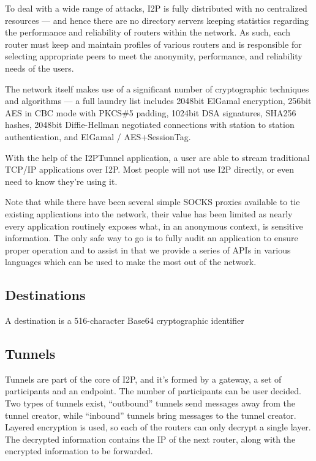 \documentclass[a4paper,twocolumn,12pt]{article}
\begin{document}
To deal with a wide range of attacks, I2P is fully distributed with no centralized resources --- and hence there are no directory servers keeping statistics regarding the performance and reliability of routers within the network. As such, each router must keep and maintain profiles of various routers and is responsible for selecting appropriate peers to meet the anonymity, performance, and reliability needs of the users.

The network itself makes use of a significant number of cryptographic techniques and algorithms --- a full laundry list includes 2048bit ElGamal encryption, 256bit AES in CBC mode with PKCS\#5 padding, 1024bit DSA signatures, SHA256 hashes, 2048bit Diffie-Hellman negotiated connections with station to station authentication, and ElGamal / AES+SessionTag.

\vspace{2 em}

With the help of the I2PTunnel application, a user are able to stream traditional TCP/IP applications over I2P. Most people will not use I2P directly, or even need to know they're using it.

Note that while there have been several simple SOCKS proxies available to tie existing applications into the network, their value has been limited as nearly every application routinely exposes what, in an anonymous context, is sensitive information. The only safe way to go is to fully audit an application to ensure proper operation and to assist in that we provide a series of APIs in various languages which can be used to make the most out of the network.

\subsection{Destinations}

A destination is a 516-character Base64 cryptographic identifier

\subsection{Tunnels}

Tunnels are part of the core of I2P, and it's formed by a gateway, a set of participants and an endpoint. The number of participants can be user decided. Two types of tunnels exist, ``outbound'' tunnels send messages away from the tunnel creator, while ``inbound'' tunnels bring messages to the tunnel creator. Layered encryption is used, so each of the routers can only decrypt a single layer. The decrypted information contains the IP of the next router, along with the encrypted information to be forwarded.
\end{document}
